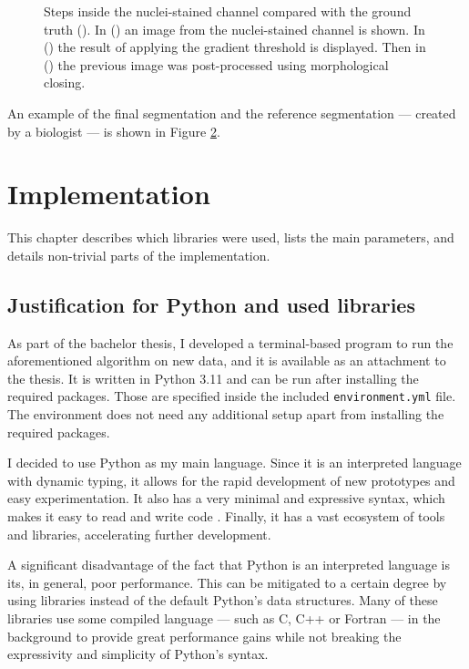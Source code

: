 \documentclass[
  digital,     %
  oneside,     %
  nosansbold,  %
  nocolorbold, %
  lof,         %
  lot,         %
]{fithesis4}
\begin{document}
\begin{figure}
\begin{subfigure}[t]{0.45\textwidth}
        \caption{}
        \label{fig:ground-truth-crop}
    \end{subfigure}
    \caption{Steps inside the nuclei-stained channel compared with the ground
    truth (). In () an image from the nuclei-stained channel is shown. In () the result of applying the gradient threshold is displayed. Then in () the previous image was post-processed using morphological closing.}
\end{figure}

An example of the final segmentation and the reference segmentation --- created by a
biologist --- is shown in Figure \ref{fig:ground-truth-crop}.

\clearpage

\chapter{Implementation}
\label{chp:implementation}
This chapter describes which libraries were used, lists the main parameters, and
details non-trivial parts of the implementation.

\section{Justification for Python and used libraries}
As part of the bachelor thesis, I developed a terminal-based program to run the
aforementioned algorithm on new data, and it is available as an attachment to the
thesis. It is written in Python 3.11 and can be run after installing the
required packages. Those are specified inside the included
\texttt{environment.yml} file. The environment does not need any additional setup
apart from installing the required packages.

I decided to use Python as my main language. Since it is an interpreted language
with dynamic typing, it allows for the rapid development of new prototypes and easy
experimentation. It also has a very minimal and expressive syntax, which makes
it easy to read and write code \cite{python-docs-tutorial}. Finally, it has a
vast ecosystem of tools and libraries, accelerating further development. 

A significant disadvantage of the fact that Python is an interpreted language
is its, in general, poor performance. This can be mitigated to a certain degree
by using libraries instead of the default Python's data structures. Many of
these libraries use some compiled language --- such as C, C++ or Fortran --- in
the background to provide great performance gains while not breaking
the expressivity and simplicity of Python's syntax.
\end{document}
